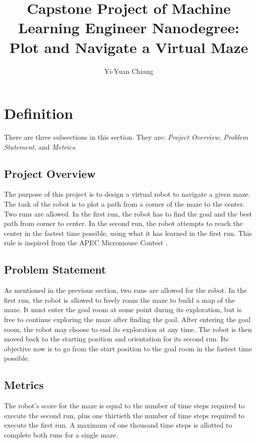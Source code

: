 \documentclass[11pt, oneside]{article}   	%
\begin{document}
\baselineskip=20pt

\title{Capstone Project of Machine Learning Engineer Nanodegree: Plot and Navigate a Virtual Maze}
\author{\wesu Yi-Yuan Chiang}
\maketitle
\section{Definition}
There are three subsections in this section. They are: {\it Project Overview}, {\it Problem Statement}, and {\it Metrics}.

\subsection{Project Overview}
The purpose of this project is to design a virtual robot to navigate a given maze. The task of the robot is to plot a path from a corner of the maze to the center. Two runs are allowed. In the first run, the robot has to find the goal and the best path from corner to center. In the second run, the robot attempts to reach the center in the fastest time possible, using what it has learned in the first run. This rule is inspired from the APEC Micromouse Contest {\cite {apec}}.
\subsection{Problem Statement}
As mentioned in the previous section, two runs are allowed for the robot. In the first run, the robot is allowed to freely roam the maze to build a map of the maze. It must enter the goal room at some point during its exploration, but is free to continue exploring the maze after finding the goal. After entering the goal room, the robot may choose to end its exploration at any time. The robot is then moved back to the starting position and orientation for its second run. Its objective now is to go from the start position to the goal room in the fastest time possible.
\subsection{Metrics}
The robot's score for the maze is equal to the number of time steps required to execute the second run, plus one thirtieth the number of time steps required to execute the first run. A maximum of one thousand time steps is allotted to complete both runs for a single maze.
\end{document}
